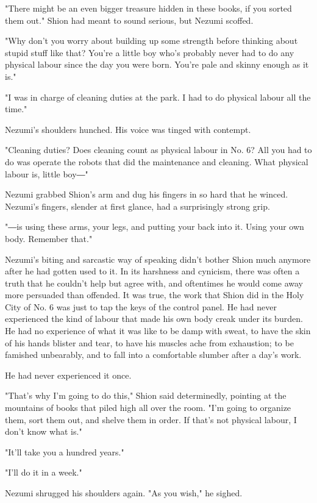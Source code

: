 "There might be an even bigger treasure hidden in these books, if you
sorted them out." Shion had meant to sound serious, but Nezumi scoffed.

"Why don't you worry about building up some strength before thinking
about stupid stuff like that? You're a little boy who's probably never
had to do any physical labour since the day you were born. You're pale
and skinny enough as it is."

"I was in charge of cleaning duties at the park. I had to do physical
labour all the time."

Nezumi's shoulders hunched. His voice was tinged with contempt.

"Cleaning duties? Does cleaning count as physical labour in No. 6? All
you had to do was operate the robots that did the maintenance and
cleaning. What physical labour is, little boy―"

Nezumi grabbed Shion's arm and dug his fingers in so hard that he
winced. Nezumi's fingers, slender at first glance, had a surprisingly
strong grip.

"―is using these arms, your legs, and putting your back into it. Using
your own body. Remember that."

Nezumi's biting and sarcastic way of speaking didn't bother Shion much
anymore after he had gotten used to it. In its harshness and cynicism,
there was often a truth that he couldn't help but agree with, and
oftentimes he would come away more persuaded than offended. It was true,
the work that Shion did in the Holy City of No. 6 was just to tap the
keys of the control panel. He had never experienced the kind of labour
that made his own body creak under its burden. He had no experience of
what it was like to be damp with sweat, to have the skin of his hands
blister and tear, to have his muscles ache from exhaustion; to be
famished unbearably, and to fall into a comfortable slumber after a
day's work.

He had never experienced it once.

"That's why I'm going to do this," Shion said determinedly, pointing at
the mountains of books that piled high all over the room. "I'm going to
organize them, sort them out, and shelve them in order. If that's not
physical labour, I don't know what is."

"It'll take you a hundred years."

"I'll do it in a week."

Nezumi shrugged his shoulders again. "As you wish," he sighed.

